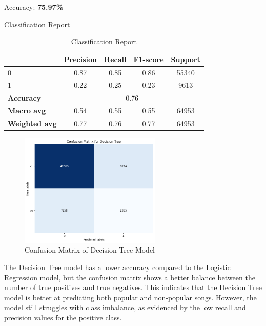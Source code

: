 Accuracy: \textbf{75.97\%}

Classification Report
\begin{table}[h]
    \centering
    \begin{tabular}{lcccc}
        \toprule
        & \textbf{Precision} & \textbf{Recall} & \textbf{F1-score} & \textbf{Support} \\
        \midrule
        0 & 0.87 & 0.85 & 0.86 & 55340 \\
        1 & 0.22 & 0.25 & 0.23 & 9613 \\
        \midrule
        \textbf{Accuracy} & \multicolumn{4}{c}{0.76} \\
        \textbf{Macro avg} & 0.54 & 0.55 & 0.55 & 64953 \\
        \textbf{Weighted avg} & 0.77 & 0.76 & 0.77 & 64953 \\
        \bottomrule
    \end{tabular}
    \caption{Classification Report}
    \label{tab:classification_report}
\end{table}
 
\begin{figure}[h] 
    \centering 
    \includegraphics[width=0.6\textwidth]{media/decision_tree_conf_matr.png}
    \caption{Confusion Matrix of Decision Tree Model}

\end{figure}

The Decision Tree model has a lower accuracy compared to the Logistic Regression model, but the confusion matrix shows a better balance between the number of true positives and true negatives. This indicates that the Decision Tree model is better at predicting both popular and non-popular songs. However, the model still struggles with class imbalance, as evidenced by the low recall and precision values for the positive class. %

